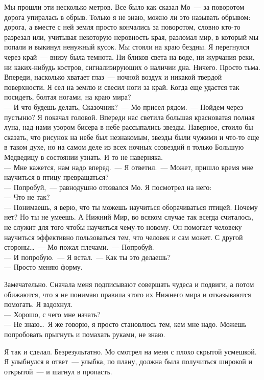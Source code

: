 Мы прошли эти несколько метров. Все было как сказал Мо~--- за поворотом дорога 
упиралась в обрыв. Только я не знаю, можно ли это называть обрывом: дорога, а 
вместе с ней земля просто кончались за поворотом, словно кто-то разрезал или, 
учитывая некоторую неровность края, разломал мир, в который мы попали и выкинул 
ненужный кусок. Мы стояли на краю бездны. Я перегнулся через край~--- внизу 
была 
темнота. Ни бликов света на воде, ни журчания реки, ни каких-нибудь костров, 
сигнализирующих о наличии дна. Ничего. Просто тьма. Впереди, насколько хватает 
глаз~--- ночной воздух и никакой твердой поверхности. Я сел на землю и свесил 
ноги 
за край. Когда еще удастся так посидеть, болтая ногами, на краю мира?\\
--- И что будешь делать, Сказочник?~--- Мо присел рядом.~--- Пойдем через 
пустыню? Я 
покачал головой. Впереди нас светила большая красноватая полная луна, над нами 
узором бисера в небе рассыпались звезды. Наверное, стоило бы сказать, что 
рисунок на небе был незнакомым, звезды были чужими и что-то еще в таком духе, 
но 
на самом деле из всех ночных созвездий я только Большую Медведицу в состоянии 
узнать. И то не наверняка. \\
--- Мне кажется, нам надо вперед.~--- Я ответил.~--- Может, пришло время мне 
научиться в птицу превращаться?\\
--- Попробуй,~--- равнодушно отозвался Мо. Я посмотрел на него:\\
--- Что не так?\\
--- Понимаешь, я верю, что ты можешь научиться оборачиваться птицей. Почему нет? 
Но ты не умеешь. А Нижний Мир, во всяком случае так всегда считалось, не служит 
для того чтобы научиться чему-то новому. Он помогает человеку научиться 
эффективно пользоваться тем, что человек и сам может. С другой 
стороны\ldots~--- Мо пожал плечами.~--- Попробуй.\\
--- И попробую.~--- Я встал.~--- Как ты это делаешь?\\
--- Просто меняю форму. 

Замечательно. Сначала меня подписывают совершать чудеса и подвиги, а потом 
обижаются, что я не понимаю правила этого их Нижнего мира и отказываются 
помогать. Я вздохнул.\\
--- Хорошо, с чего мне начать?\\
--- Не знаю\ldots\ Я же говорю, я просто становлюсь тем, кем мне надо. Можешь 
попробовать прыгнуть и помахать руками, не знаю.

Я так и сделал. Безрезультатно. Мо смотрел на меня с плохо скрытой усмешкой. Я 
улыбнулся в ответ~--- улыбка, по плану, должна была получиться широкой и 
открытой~--- и шагнул в пропасть.

